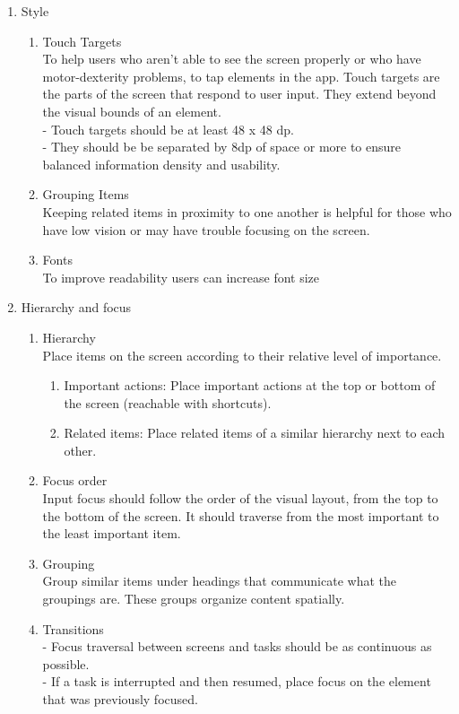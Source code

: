 \documentclass[12pt]{article}
\begin{document}
{{\begin{enumerate}
    \item{Style}
    	\begin{enumerate}
        	\item{Touch Targets\\To help users who aren't able to see the screen properly or who have motor-dexterity problems, to tap elements in the app. Touch targets are the parts of the screen that respond to user input. They extend beyond the visual bounds of an element. \\- Touch targets should be at least 48 x 48 dp. \\- They should be be separated by 8dp of space or more to ensure balanced information density and usability. }
            \item{Grouping Items\\Keeping related items in proximity to one another is helpful for those who have low vision or may have trouble focusing on the screen.}
            \item{Fonts\\To improve readability users can increase font size}
        \end{enumerate}
    \item{Hierarchy and focus}
    	\begin{enumerate}
        	\item{Hierarchy\\Place items on the screen according to their relative level of importance.}
            \begin{enumerate}
            	\item{Important actions: Place important actions at the top or bottom of the screen (reachable with shortcuts).}
                \item{Related items: Place related items of a similar hierarchy next to each other.}
            \end{enumerate}
            \item{Focus order\\Input focus should follow the order of the visual layout, from the top to the bottom of the screen. It should traverse from the most important to the least important item.}
            \item{Grouping\\Group similar items under headings that communicate what the groupings are. These groups organize content spatially.}
            \item{Transitions\\
- Focus traversal between screens and tasks should be as continuous as possible.\\
- If a task is interrupted and then resumed, place focus on the element that was previously focused.}


\end{enumerate}
\end{enumerate}}}
\end{document}
